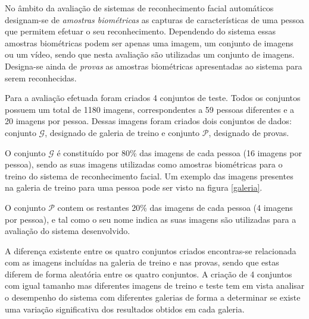 No âmbito da avaliação de sistemas de reconhecimento facial automáticos designam-se de \textit{amostras biométricas} as capturas de características de uma pessoa que permitem efetuar o seu reconhecimento. Dependendo do sistema essas amostras biométricas podem ser apenas uma imagem, um conjunto de imagens ou um vídeo, sendo que nesta avaliação são utilizadas um conjunto de imagens. Designa-se ainda de \textit{provas} as amostras biométricas apresentadas ao sistema para serem reconhecidas.

Para a avaliação efetuada foram criados 4 conjuntos de teste. Todos os conjuntos possuem um total de 1180 imagens, correspondentes a 59 pessoas diferentes e a 20 imagens por pessoa. Dessas imagens foram criados dois conjuntos de dados: conjunto $\mathscr{G}$, designado de galeria de treino e conjunto $\mathscr{P}$, designado de provas. 

O conjunto $\mathscr{G}$ é constituído por 80\% das imagens de cada pessoa (16 imagens por pessoa), sendo as suas imagens utilizadas como amostras biométricas para o treino do sistema de reconhecimento facial. Um exemplo das imagens presentes na galeria de treino para uma pessoa pode ser visto na figura \ref{galeria}.

O conjunto $\mathscr{P}$ contem os restantes 20\% das imagens de cada pessoa (4 imagens por pessoa), e tal como o seu nome indica as suas imagens são utilizadas para a avaliação do sistema desenvolvido.

A diferença existente entre os quatro conjuntos criados encontras-se relacionada com as imagens incluídas na galeria de treino e nas provas, sendo que estas diferem de forma aleatória entre os quatro conjuntos. A criação de 4 conjuntos com igual tamanho mas diferentes imagens de treino e teste tem em vista analisar o desempenho do sistema com diferentes galerias de forma a determinar se existe uma variação significativa dos resultados obtidos em cada galeria.

